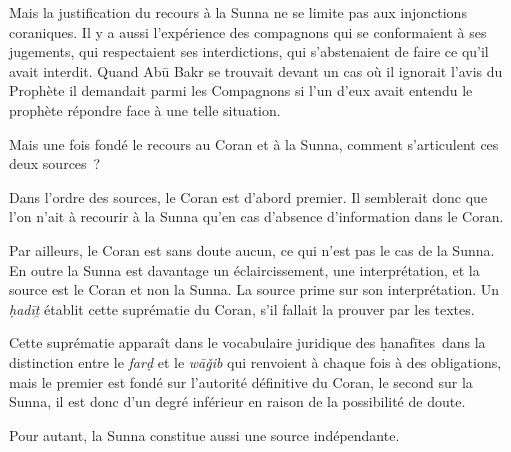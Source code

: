 Mais la justification du recours à la Sunna ne se limite pas aux
injonctions coraniques. Il y a aussi l'expérience des compagnons qui se
conformaient à ses jugements, qui respectaient ses interdictions, qui
s'abstenaient de faire ce qu'il avait interdit. Quand Abū Bakr se
trouvait devant un cas où il ignorait l'avis du Prophète il demandait
parmi les Compagnons si l'un d'eux avait entendu le prophète répondre
face à une telle situation.

Mais une fois fondé le recours au Coran et à la Sunna, comment
s'articulent ces deux sources~?



Dans l'ordre des sources, le Coran est d'abord premier. Il semblerait
donc que l'on n'ait à recourir à la Sunna qu'en cas d'absence
d'information dans le Coran.

Par ailleurs, le Coran est sans doute aucun, ce qui n'est pas le cas de
la Sunna. En outre la Sunna est davantage un éclaircissement, une
interprétation, et la source est le Coran et non la Sunna. La source
prime sur son interprétation. Un \emph{ḥadīṯ} établit cette suprématie
du Coran, s'il fallait la prouver par les textes.

Cette suprématie apparaît dans le vocabulaire juridique des
ḥanafītes~dans la distinction entre le \emph{farḍ} et le \emph{wāǧib}
qui renvoient à chaque fois à des obligations, mais le premier est fondé
sur l'autorité définitive du Coran, le second sur la Sunna, il est donc
d'un degré inférieur en raison de la possibilité de doute.

Pour autant, la Sunna constitue aussi une source indépendante.


